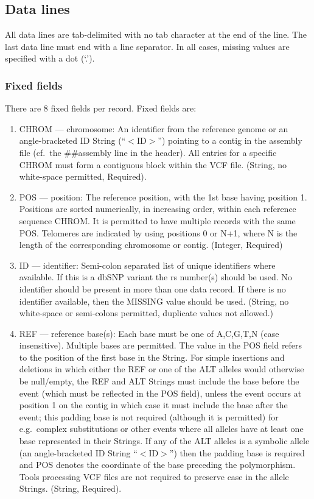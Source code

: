 \documentclass[8pt]{article}
\begin{document}
\subsection{Data lines}
\label{data-lines}
All data lines are tab-delimited with no tab character at the end of the line.
The last data line must end with a line separator.
In all cases, missing values are specified with a dot (`.').

\subsubsection{Fixed fields}
There are 8 fixed fields per record.
Fixed fields are:

\begin{enumerate}
  \item CHROM --- chromosome: An identifier from the reference genome or an angle-bracketed ID String (``$<$ID$>$'') pointing to a contig in the assembly file (cf.\ the \#\#assembly line in the header).
  All entries for a specific CHROM must form a contiguous block within the VCF file.
  (String, no white-space permitted, Required).
  \item POS --- position: The reference position, with the 1st base having position 1.
  Positions are sorted numerically, in increasing order, within each reference sequence CHROM.
  It is permitted to have multiple records with the same POS.
  Telomeres are indicated by using positions 0 or N+1, where N is the length of the corresponding chromosome or contig.
  (Integer, Required)
  \item ID --- identifier: Semi-colon separated list of unique identifiers where available.
  If this is a dbSNP variant the rs number(s) should be used.
  No identifier should be present in more than one data record.
  If there is no identifier available, then the MISSING value should be used.
  (String, no white-space or semi-colons permitted, duplicate values not allowed.)
  \item REF --- reference base(s): Each base must be one of A,C,G,T,N (case insensitive).
  Multiple bases are permitted.
  The value in the POS field refers to the position of the first base in the String.
  For simple insertions and deletions in which either the REF or one of the ALT alleles would otherwise be null/empty, the REF and ALT Strings must include the base before the event (which must be reflected in the POS field), unless the event occurs at position 1 on the contig in which case it must include the base after the event; \pagebreak[1] this padding base is not required (although it is permitted) for e.g.\ complex substitutions or other events where all alleles have at least one base represented in their Strings.
  If any of the ALT alleles is a symbolic allele (an angle-bracketed ID String ``$<$ID$>$'') then the padding base is required and POS denotes the coordinate of the base preceding the polymorphism.
  Tools processing VCF files are not required to preserve case in the allele Strings. (String, Required).


\end{enumerate}
\end{document}
